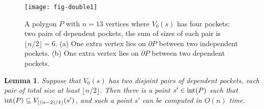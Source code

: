 \documentclass[12pt]{article}
\newcommand{\floor}[1]{{\lfloor #1 \rfloor}}
\newtheorem{lemma}{Lemma}
\begin{document}
\begin{figure}[htp]
  \centering
  \texttt{[image: fig-double1]}
  \caption{\label{fig:double1}
A polygon $P$ with $n=13$ vertices where $V_0(s)$ has four pockets: two pairs of dependent pockets, the
sum of sizes of each pair is $\floor{n/2} =6$.
(a) One extra vertex lies on $\partial P$ between two independent pockets.
(b) One extra vertex lies on $\partial P$ between two dependent pockets.}
\end{figure}

\begin{lemma}\label{lem:violate1}
Suppose that $V_0(s)$ has two disjoint pairs of dependent pockets, each
pair of total size at least $\floor{n/2}$. Then there is a point $s'\in {\rm int}(P)$ such that
${\rm int}(P)\subseteq V_{\floor{(n-2)/4}}(s')$, and such a point $s'$ can be computed in $O(n)$ time.
\end{lemma}
\end{document}
